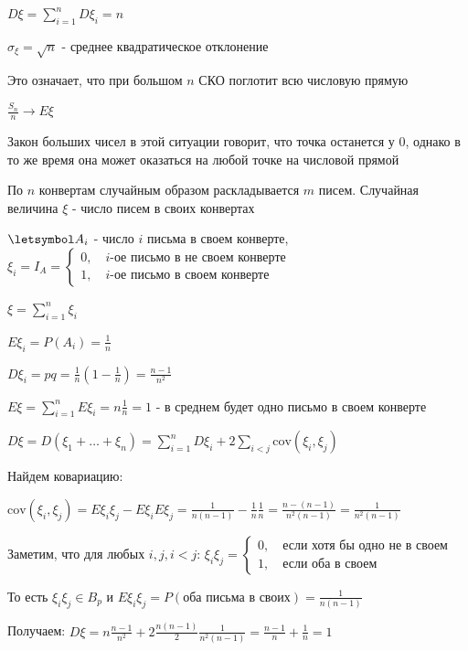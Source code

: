 \documentclass[12pt]{article}
\begin{document}
    $D\xi = \sum_{i = 1}^n D\xi_i = n$

    $\sigma_\xi = \sqrt{n}$ - среднее квадратическое отклонение

    Это означает, что при большом $n$ СКО поглотит всю числовую прямую

    $\frac{S_n}{n} \to E\xi$

    Закон больших чисел в этой ситуации говорит, что точка останется у 0, однако в то же время она может оказаться на любой точке на числовой прямой

    \Ex По $n$ конвертам случайным образом раскладывается $m$ писем. Случайная величина $\xi$ - число писем в своих конвертах

    $\letsymbol A_i$ - число $i$ письма в своем конверте, $\xi_i = I_A = \begin{cases}0, \quad i\text{-ое письмо в не своем конверте} \\ 1, \quad i\text{-ое письмо в своем конверте} \end{cases}$

    $\xi = \sum_{i = 1}^n \xi_i$

    $E\xi_i = P(A_i) = \frac{1}{n}$

    $D\xi_i = pq = \frac{1}{n} (1 - \frac{1}{n}) = \frac{n - 1}{n^2}$

    $E\xi = \sum_{i = 1}^n E\xi_i = n \frac{1}{n} = 1$ - в среднем будет одно письмо в своем конверте

    $D\xi = D(\xi_1 + \dots + \xi_n) = \sum_{i = 1}^n D\xi_i + 2\sum_{i < j} \mathrm{cov} (\xi_i, \xi_j)$

    Найдем ковариацию:

    $\mathrm{cov}(\xi_i, \xi_j) = E\xi_i \xi_j - E\xi_i E\xi_j = \frac{1}{n(n - 1)} - \frac{1}{n}\frac{1}{n} = \frac{n - (n - 1)}{n^2(n - 1)} = \frac{1}{n^2(n - 1)}$

    Заметим, что для любых $i, j, i < j$: $\xi_i \xi_j = \begin{cases}0, \quad \text{если хотя бы одно не в своем} \\ 1, \quad \text{если оба в своем}\end{cases}$
    
    То есть $\xi_i\xi_j \in B_p$ и $E\xi_i \xi_j = P(\text{оба письма в своих}) = \frac{1}{n(n - 1)}$

    Получаем: $D\xi = n \frac{n - 1}{n^2} + 2\frac{n(n - 1)}{2}\frac{1}{n^2(n - 1)} = \frac{n - 1}{n} + \frac{1}{n} = 1$

\end{document}

